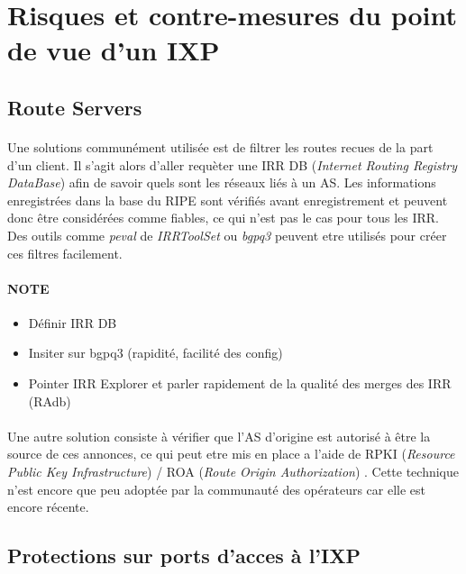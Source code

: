 \section{Risques et contre-mesures du point de vue d'un IXP}

\subsection{Route Servers}

\paragraph{}
Une solutions communément utilisée est de filtrer les routes recues de la part d'un client. Il s'agit alors d'aller requèter une IRR DB (\emph{Internet Routing Registry DataBase}) afin de savoir quels sont les réseaux liés à un AS. Les informations enregistrées dans la base du RIPE sont vérifiés avant enregistrement et peuvent donc être considérées comme fiables, ce qui n'est pas le cas pour tous les IRR. Des outils comme \emph{peval} de \emph{IRRToolSet}\cite{fenioux:IRRTOOLSET} ou \emph{bgpq3}\cite{fenioux:BGPQ3} peuvent etre utilisés pour créer ces filtres facilement.

\paragraph{NOTE}
\begin{itemize}
\item Définir IRR DB
\item Insiter sur bgpq3 (rapidité, facilité des config)
\item Pointer IRR Explorer et parler rapidement de la qualité des merges des IRR (RAdb)
\end{itemize}

\paragraph{}
Une autre solution consiste à vérifier que l'AS d'origine est autorisé à être la source de ces annonces, ce qui peut etre mis en place a l'aide de RPKI (\emph{Resource Public Key Infrastructure}) / ROA (\emph{Route Origin Authorization}) \cite{fenioux:RPKIROA}. Cette technique n'est encore que peu adoptée par la communauté des opérateurs car elle est encore récente.


\subsection{Protections sur ports d'acces à l'IXP}

